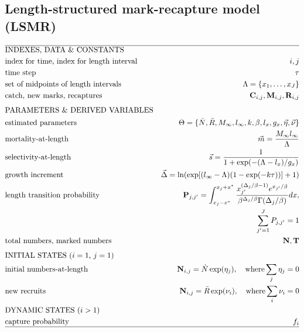 \subsection{Length-structured mark-recapture model (LSMR)}






\begin{table}
  \centering
\caption{Data, parameters, and analytical procedures for the length-based mark-recapture model.}\label{table:LSMRmodel} 
\tableEq
	\begin{small}
    \begin{align}
        \hline
		&\mbox{INDEXES, DATA \& CONSTANTS} \nonumber\\
		&\mbox{index for time, index for length interval} 
		&i,j \label{eq:T1.1}\\ 
		&\mbox{time step}  & \tau\\
		&\mbox{set of midpoints of length intervals}
		&\Lambda = \{x_1, \ldots,x_J\}\\
		&\mbox{catch, new marks, recaptures} 
		&\mathbf{C}_{i,j}, \mathbf{M}_{i,j}, \mathbf{R}_{i,j}\\[1ex]
		&\mbox{PARAMETERS \& DERIVED VARIABLES} \nonumber\\
		&\mbox{estimated parameters} 
		&\Theta=\{\dot{N},\bar{R},M_\infty,l_\infty,k,\beta,l_x,g_x,
			\vec{\eta},\vec{\nu} \}\\
		&\mbox{mortality-at-length} 
		& \vec{m} = \frac{M_\infty l_\infty}{\Lambda}
		\label{eq:T1.6}\\
		&\mbox{selectivity-at-length} 
		& \vec{s} = \frac{1}{1+\exp(-(\Lambda-l_x)/g_x)}
		\label{eq:T1.7}\\
		&\mbox{growth increment} 
		& \vec{\Delta} = \ln( \exp[(l_\infty-\Lambda)(1-\exp(-k \tau))] +1)
		\label{eq:T1.8}\\
		&\mbox{length transition probability}
		& \mathbf{P}_{j,j'} =\int_{x_j-x^*}^{x_j+x^*} \frac{x_{j'}^{(\Delta_{j}/\beta-1)}
		e^{x_{j'}/\beta}}{\beta^{\Delta_{j}/\beta} \Gamma(\Delta_{j}/\beta)}dx, \nonumber\\
		& &\quad \sum_{j'=1}^J P_{j,j'}= 1 
		\label{eq:T1.9}\\
		&\mbox{total numbers, marked numbers} 
		& \mathbf{N}, \mathbf{T}\\[1ex]
		&\mbox{INITIAL STATES ($i=1$, $j=1$)}  \nonumber\\
		&\mbox{initial numbers-at-length}
		&\mathbf{N}_{i,j} = \dot{N}\exp(\eta_j), \quad \mbox{where} \sum_j \eta_j=0
		\label{eq:T1.11}\\
		&\mbox{new recruits}
		&\mathbf{N}_{i,j} = \bar{R}\exp(\nu_i), \quad \mbox{where} \sum_i \nu_i=0
		\label{eq:T1.12}\\
		&\mbox{DYNAMIC STATES ($i>1$)} \nonumber\\
		&\mbox{capture probability} 
		& f_i\\
		\hline \nonumber
    \end{align}
\end{small}
    \normalEq
\end{table}

